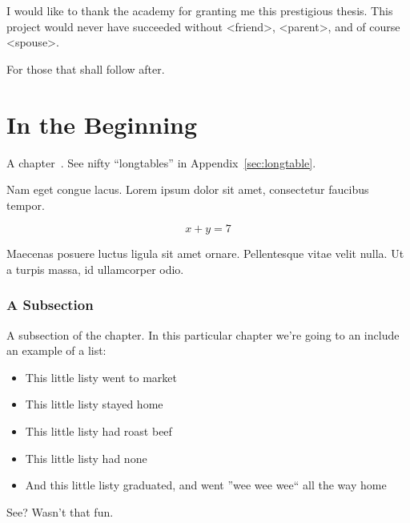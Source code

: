 \documentclass[letterpaper,12pt]{article}
\begin{document}

\begin{acknowledgments}
I would like to thank the academy for granting me this prestigious thesis.  This project would never have succeeded without <friend>, <parent>, and of course <spouse>.
\end{acknowledgments}
\newpage


\begin{dedication}
For those that shall follow after.
\end{dedication}
\newpage


\bodymatter



\chapter{In the Beginning}
A chapter~\cite{ref:A,ref:B,ref:C}. See nifty ``longtables'' in Appendix~\ref{sec:longtable}.

Nam eget congue lacus. Lorem ipsum dolor sit amet, consectetur faucibus tempor.

\begin{equation}
x+y=7
\end{equation}

Maecenas posuere luctus ligula sit amet ornare. Pellentesque vitae velit nulla. Ut a turpis massa, id ullamcorper odio.

\subsection{A Subsection}%
A subsection of the chapter.  In this particular chapter we're going to an include an example of a list:
\begin{itemize}
	\item This little listy went to market
	\item This little listy stayed home
	\item This little listy had roast beef
	\item This little listy had none
	\item And this little listy graduated, and went ''wee wee wee`` all the way home
\end{itemize}
See? Wasn't that fun.
\end{document}
